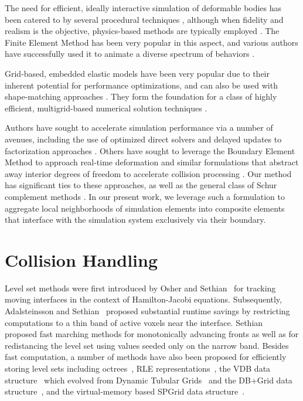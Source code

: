 \documentclass[12pt,oneside,letterpaper]{memoir}
\begin{document}
The need for efficient, ideally interactive simulation of deformable
bodies has been catered to by several procedural techniques
\cite{JoshiMDGS:2007,KavanCZO:2008,VaillBGCRWGP:2013}, although when
fidelity and realism is the objective, physics-based methods are
typically employed \cite{TerzoPBF:1987}. The Finite Element Method has
been very popular in this aspect, and various authors have
successfully used it to animate a diverse spectrum of behaviors
\cite{OBriH:1999,TeranBHF:2003,IrvinTF:2004}.
 
Grid-based, embedded elastic models
\cite{MuellTG:2004,NesmePF:2006,McAdaZSETTS:2011,PatteMS:2012,MitchCS:2015}
have been very popular due to their inherent potential for performance
optimizations, and can also be used with shape-matching approaches
\cite{RiverJ:2007}. They form the foundation for a class of highly
efficient, multigrid-based numerical solution techniques
\cite{ZhuSTB:2010,GeorgW:2008,DickGW:2011}.

Authors have sought to accelerate simulation performance via a number
of avenues, including the use of optimized direct solvers
\cite{SinSB:2013} and delayed updates to factorization approaches
\cite{HechtLSO:2012}. Others have sought to leverage the Boundary
Element Method \cite{JamesP:1999} to approach real-time deformation
and similar formulations that abstract away interior degrees of
freedom to accelerate collision processing \cite{GaoMS:2014}. Our
method has significant ties to these approaches, as well as the
general class of Schur complement methods \cite{QuartV:1999}. In our
present work, we leverage such a formulation to aggregate local
neighborhoods of simulation elements into composite elements that
interface with the simulation system exclusively via their boundary.

\section{Collision Handling}

Level set methods were first introduced by Osher and
Sethian~ for tracking moving interfaces in the
context of Hamilton-Jacobi equations.  Subsequently, Adalsteinsson and
Sethian~ proposed substantial runtime savings
by restricting computations to a thin band of active voxels near the
interface.  Sethian~ proposed fast marching
methods for monotonically advancing fronts as well as for redistancing
the level set using values seeded only on the narrow band.  Besides
fast computation, a number of methods have also been proposed for
efficiently storing level sets including octrees~\cite{LosasGF:2004},
RLE representations~\cite{HoustNBNM:2006,IrvinGLF:2006,ChentM:2011},
the VDB data structure~\cite{Muset:2013} which evolved from Dynamic
Tubular Grids~\cite{NielsM:2006} and the DB+Grid data
structure~\cite{Muset:2011}, and the virtual-memory based SPGrid data
structure~\cite{SetalABS:2014}.
\end{document}

